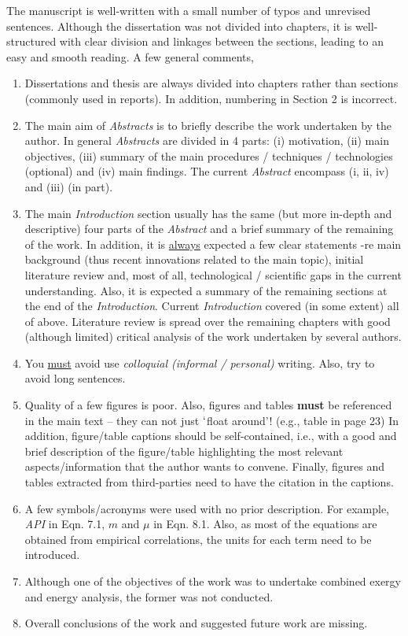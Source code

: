 \documentclass[14pt,twoside]{report}
\begin{document}
\begin{description}
The manuscript is well-written with a small number of typos and unrevised sentences. Although the dissertation was not divided into chapters, it is well-structured with clear division and linkages between the sections, leading to an easy and smooth reading. A few general comments,
\begin{enumerate}
%
\item Dissertations and thesis are always divided into chapters rather than sections (commonly used in reports). In addition, numbering in Section 2 is incorrect.
%
\item The main aim of {\it Abstracts} is to briefly describe the work undertaken by the author. In general {\it Abstracts} are divided in 4 parts: (i) motivation, (ii) main objectives, (iii) summary of the main procedures / techniques / technologies (optional) and (iv) main findings. The current {\it Abstract} encompass (i, ii, iv) and (iii) (in part). 
%
\item The main {\it Introduction} section usually has the same (but more in-depth and descriptive) four parts of the {\it Abstract} and a brief summary of the remaining of the work. In addition, it is \underline{always} expected a few clear statements -re main background (thus recent innovations related to the main topic), initial literature review and, most of all, technological / scientific gaps in the current understanding. Also, it is expected a summary of the remaining sections at the end of the {\it Introduction}.  Current {\it Introduction} covered (in some extent) all of above. Literature review is spread over the remaining chapters with good (although limited) critical analysis of the work undertaken by several authors. 
%
\item You \underline{must} avoid use {\it colloquial (informal / personal)} writing. Also, try to avoid long sentences. 
%
\item Quality of a few figures is poor. Also, figures and tables {\bf must} be referenced in the main text -- they can not just $\lq$float around'! (e.g., table in page 23) In addition, figure/table captions should be self-contained, i.e., with a good and brief description of the figure/table highlighting the most relevant aspects/information that the author wants to convene. Finally, figures and tables extracted from third-parties need to have the citation in the captions. 
%
\item A few symbols/acronyms were used with no prior description. For example, {\it API} in Eqn. 7.1, $m$ and $\mu$ in Eqn. 8.1. Also, as most of the equations are obtained from empirical correlations, the units for each term need to be introduced.
%
\item Although one of the objectives of the work was to undertake combined exergy and energy analysis, the former was not conducted.
%
\item Overall conclusions of the work and suggested future work are missing.
%
\end{enumerate}


\end{description}
\end{document}
